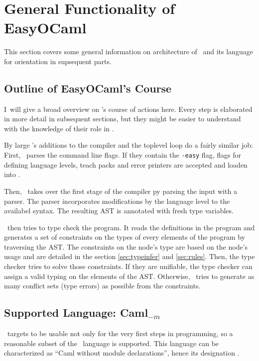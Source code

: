 
\section{General Functionality of EasyOCaml}

This section covers some general information on architecture of \easyocaml\ and
its language for orientation in supsequent parts.

\subsection{Outline of EasyOCaml's Course}

I\what\ will give a broad overview on \easyocaml's course of actions here.
Every step is elaborated in more detail in subsequent sections, but they might
be easier to understand with the knowledge of their role in \easyocaml.

By large \easyocaml's additions to the compiler and the toplevel loop do a
fairly similar job: First, \easyocaml\ parses the command line flags. If they
contain the \texttt{-easy} flag, flags for defining language levels, teach packs
and error printers are accepted and loaden into \easyocaml.

Then, \easyocaml\ takes over the first stage of the compiler py parsing the
input with a \camlpf parser. The parser incorporates modifications by the
language level to the availabel syntax. The resulting AST is annotated with
fresh type variables.

\easyocaml\ then tries to type check the program. It reads the definitions in
the program and generates a set of constraints on the types of every elements of
the program by traversing the AST. The constraints on the node's type are based
on the node's usage and are detailed in the section \ref{sec:typeinfer} and
\ref{sec:rules}.
Then, the type checker tries to solve those constraints. If they are unifiable,
the type checker can assign a valid typing on the elements of the AST.
Otherwise, \easyocaml\ tries to generate as many conflict sets (type errors) as
possible from the constraints.

\subsection{Supported Language: Caml$_{-m}$}
\label{sec:language}

\easyocaml\ targets to be usable not only for the very first steps in
programming, so a reasonable subset of the \ocaml\ language is supported.
This language can be characterized as ``Caml without module declarations'',
hence its designation \camlm.

